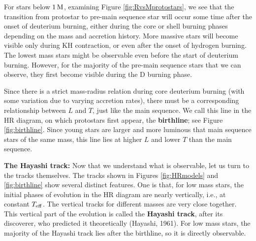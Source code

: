 \documentclass[a4paper,10pt]{article}
\begin{document}
{\noindent}For stars below $1\,{\rm M}$, examining Figure \ref{fig:RvsMprotostars}, we see that the transition from protostar to pre-main sequence star will occur some time after the onset of deuterium burning, either during the core or shell burning phases depending on the mass and accretion history. More massive stars will become visible only during KH contraction, or even after the onset of hydrogen burning. The lowest mass stars might be observable even before the start of deuterium burning. However, for the majority of the pre-main sequence stars that we can observe, they first become visible during the D burning phase.

{\noindent}Since there is a strict mass-radius relation during core deuterium burning (with some variation due to varying accretion rates), there must be a corresponding relationship between $L$ and $T$, just like the main sequence. We call this line in the HR diagram, on which protostars first appear, the \textbf{birthline}; see Figure \ref{fig:birthline}. Since young stars are larger and more luminous that main sequence stars of the same mass, this line lies at higher $L$ and lower $T$ than the main sequence.

{\noindent}\textbf{The Hayashi track:} Now that we understand what is observable, let us turn to the tracks themselves. The tracks shown in Figures \ref{fig:HRmodels} and \ref{fig:birthline} show several distinct features. One is that, for low mass stars, the initial phases of evolution in the HR diagram are nearly vertically, i.e., at constant $T_{\rm eff}$. The vertical tracks for different masses are very close together. This vertical part of the evolution is called the \textbf{Hayashi track}, after its discoverer, who predicted it theoretically (Hayashi, 1961). For low mass stars, the majority of the Hayashi track lies after the birthline, so it is directly observable.
\end{document}
